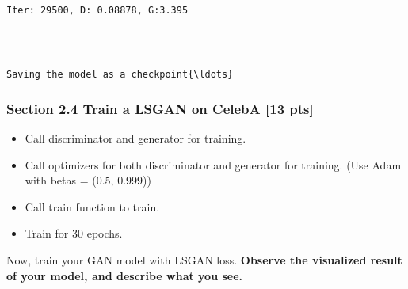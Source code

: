 \documentclass[11pt]{article}
\providecommand{\tightlist}{%
      \setlength{\itemsep}{0pt}\setlength{\parskip}{0pt}}
\begin{document}
    \begin{center}
    \end{center}
    { \hspace*{\fill} \\}
    
    \begin{Verbatim}[commandchars=\\\{\}]

Iter: 29500, D: 0.08878, G:3.395
    \end{Verbatim}

    \begin{center}
    \end{center}
    { \hspace*{\fill} \\}
    
    \begin{Verbatim}[commandchars=\\\{\}]

Saving the model as a checkpoint{\ldots}
    \end{Verbatim}

    \hypertarget{section-2.4-train-a-lsgan-on-celeba-13-pts}{%
\subsubsection{Section 2.4 Train a LSGAN on CelebA {[}13
pts{]}}\label{section-2.4-train-a-lsgan-on-celeba-13-pts}}

\begin{itemize}
\tightlist
\item
  Call discriminator and generator for training.
\item
  Call optimizers for both discriminator and generator for training.
  (Use Adam with betas = (0.5, 0.999))
\item
  Call train function to train.
\item
  Train for 30 epochs.
\end{itemize}

Now, train your GAN model with LSGAN loss. \textbf{Observe the
visualized result of your model, and describe what you see.}
\end{document}
